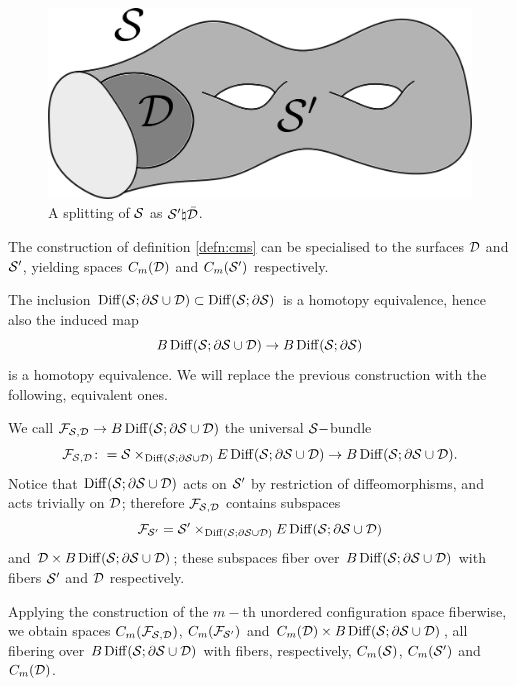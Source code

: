 \begin{figure}\centering
 \includegraphics[scale=0.8]{figures/SS'D.png}
 \caption{A splitting of $\S$ as $\S'\natural\bar\D$.}
\label{fig:SS'D}
\end{figure}

The construction of definition \ref{defn:cms} can be specialised to the
surfaces $\D$ and $\S'$, yielding spaces $C_m(\D)$ and $C_m(\S')$ respectively.

The inclusion $\Diff(\S;\partial\S\cup\D)\subset\Diff(\S;\partial\S)$ is a homotopy
equivalence, hence also the induced map
\[
B\Diff(\S;\partial\S\cup\D)\to B\Diff(\S;\partial\S)
\]
is a homotopy equivalence. We will replace the previous construction with the following,
equivalent ones.
\begin{defn}
\label{defn:universalSbundle}
We call $\cF_{\S,\D}\to B\Diff(\S;\partial\S\cup\D)$
the universal $\S-$bundle
 \[
  \cF_{\S,\D}\colon=\S\times_{\Diff(\S;\partial\S\cup\D)}E\Diff(\S;\partial\S\cup\D)\to B\Diff(\S;\partial\S\cup\D).
 \]
Notice that $\Diff(\S;\partial\S\cup\D)$ acts on $\S'$ by restriction of diffeomorphisms, and acts trivially
on $\D$; therefore $\cF_{\S,\D}$ contains subspaces
\[
 \cF_{\S'}= \S'\times_{\Diff(\S;\partial\S\cup\D)}E\Diff(\S;\partial\S\cup\D)
\]
and $\D\times B\Diff(\S;\partial\S\cup\D)$; these subspaces fiber over $B\Diff(\S;\partial\S\cup\D)$
with fibers $\S'$ and $\D$ respectively.

Applying the construction of the $m-$th unordered configuration space fiberwise, we obtain spaces
$C_m(\cF_{\S,\D})$, $C_m(\cF_{\S'})$ and $C_m(\D)\times B\Diff(\S;\partial\S\cup\D)$,
all fibering over $B\Diff(\S;\partial\S\cup\D)$ with fibers, respectively, $\cms$,
$C_m(\S')$ and $C_m(\D)$.
\end{defn}

